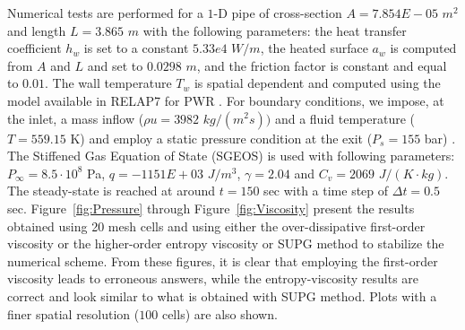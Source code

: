 \documentclass[12pt]{article}
\begin{document}
Numerical tests are performed for a $1$-D pipe of cross-section $A = 7.854E-05$ $m^2$ and length $L=3.865$ $m$ with the following parameters: the heat transfer coefficient $h_w$ is set to a constant $5.33e4$ $W/m$, the heated surface $a_w$ is computed from $A$ and $L$ and set to $0.0298$ $m$, and the friction factor is constant and equal to $0.01$. The wall temperature $T_w$ is spatial dependent and computed using the model available in RELAP7 for PWR \cite{Relap7PWR}. 
For boundary conditions, we impose, at the inlet, a mass inflow ($\rho u = 3982$ $kg/(m^2 s))$ and a fluid temperature ($T = 559.15$ K) and employ a static pressure condition at the exit ($P_s = 155$ bar) . The Stiffened Gas Equation of State (SGEOS) is used \cite{SGEOS} with following parameters: $P_{\infty} = 8.5 \cdot 10^8$ Pa, $q = -1151E+03$ $J/m^3$, $\gamma = 2.04$ and $C_v = 2069$ $J/(K \cdot kg)$. The steady-state is reached at around $t=150$ sec with a time step of $\Delta t = 0.5$ sec. Figure~\ref{fig:Pressure} through Figure~\ref{fig:Viscosity} present the results obtained using 20 mesh cells and using either the over-dissipative first-order viscosity  or the higher-order entropy viscosity or SUPG method to stabilize the numerical scheme. From these figures, it is clear that employing the first-order viscosity leads to erroneous answers, while the entropy-viscosity results are correct and look similar to what is obtained with SUPG method. Plots with a finer spatial resolution ($100$ cells) are also shown.
\end{document}
